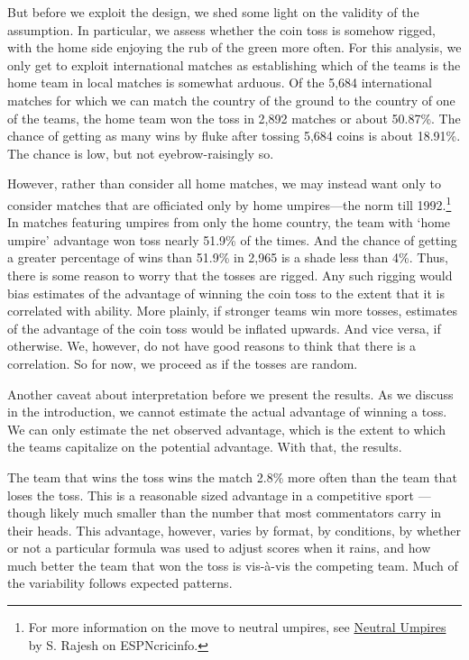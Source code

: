\documentclass[12pt]{article}
\begin{document}
But before we exploit the design, we shed some light on the validity of the assumption. In particular, we assess whether the coin toss is somehow rigged, with the home side enjoying the rub of the green more often. For this analysis, we only get to exploit international matches as establishing which of the teams is the home team in local matches is somewhat arduous. Of the 5,684 international matches for which we can match the country of the ground to the country of one of the teams, the home team won the toss in 2,892 matches or about 50.87\%. The chance of getting as many wins by fluke after tossing 5,684 coins is about 18.91\%. The chance is low, but not eyebrow-raisingly so. 

However, rather than consider all home matches, we may instead want only to consider matches that are officiated only by home umpires---the norm till 1992.\footnote{For more information on the move to neutral umpires, see \href{http://www.espncricinfo.com/magazine/content/story/511175.html}{Neutral Umpires} by S. Rajesh on ESPNcricinfo.} In matches featuring umpires from only the home country, the team with `home umpire' advantage won toss nearly 51.9\% of the times. And the chance of getting a greater percentage of wins than 51.9\% in 2,965 is a shade less than 4\%. Thus, there is some reason to worry that the tosses are rigged. Any such rigging would bias estimates of the advantage of winning the coin toss to the extent that it is correlated with ability. More plainly, if stronger teams win more tosses, estimates of the advantage of the coin toss would be inflated upwards. And vice versa, if otherwise. We, however, do not have good reasons to think that there is a correlation. So for now, we proceed as if the tosses are random. 

Another caveat about interpretation before we present the results. As we discuss in the introduction, we cannot estimate the actual advantage of winning a toss. We can only estimate the net observed advantage, which is the extent to which the teams capitalize on the potential advantage. With that, the results.

The team that wins the toss wins the match 2.8\% more often than the team that loses the toss. This is a reasonable sized advantage in a competitive sport --- though likely much smaller than the number that most commentators carry in their heads. This advantage, however, varies by format, by conditions, by whether or not a particular formula was used to adjust scores when it rains, and how much better the team that won the toss is vis-\`{a}-vis the competing team. Much of the variability follows expected patterns.
\end{document}
